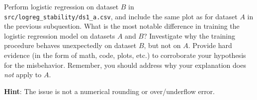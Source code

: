\item {}
Perform logistic regression on dataset $B$ in \\
\texttt{src/logreg\_stability/ds1\_a.csv}, and include the same plot as for dataset $A$ in the previous subquestion.
What is the most notable difference in training the logistic regression model
on datasets $A$ and $B$? Investigate why the training procedure behaves unexpectedly on dataset $B$, but
not on $A$. Provide hard evidence (in the form of math, code, plots, etc.) to
corroborate your hypothesis for the misbehavior. Remember, you should address
why your explanation does \emph{not} apply to $A$.

\textbf{Hint}: The issue is not a numerical rounding or over/underflow error.
